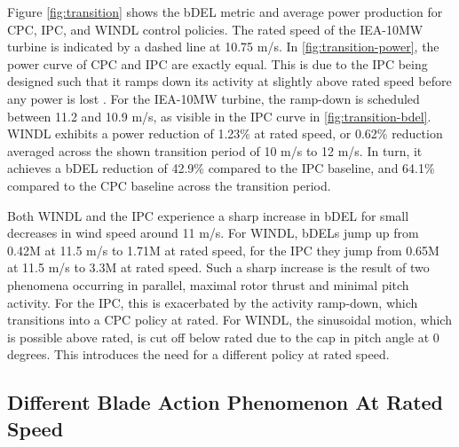 Figure \ref{fig:transition} shows the bDEL metric and average power production for CPC, IPC, and WINDL control policies. The rated speed of the IEA-10MW turbine is indicated by a dashed line at 10.75 m/s. In \ref{fig:transition-power}, the power curve of CPC and IPC are exactly equal. This is due to the IPC being designed such that it ramps down its activity at slightly above rated speed before any power is lost \cite{perez-beckerImplementationValidationAdvanced2021}. For the IEA-10MW turbine, the ramp-down is scheduled between 11.2 and 10.9 m/s, as visible in the IPC curve in \ref{fig:transition-bdel}. WINDL exhibits a power reduction of 1.23\% at rated speed, or 0.62\% reduction averaged across the shown transition period of 10 m/s to 12 m/s. In turn, it achieves a bDEL reduction of 42.9\% compared to the IPC baseline, and 64.1\% compared to the CPC baseline across the transition period. 

Both WINDL and the IPC experience a sharp increase in bDEL for small decreases in wind speed around 11 m/s. For WINDL, bDELs jump up from 0.42M at 11.5 m/s to 1.71M at rated speed, for the IPC they jump from 0.65M at 11.5 m/s to 3.3M at rated speed. Such a sharp increase is the result of two phenomena occurring in parallel, maximal rotor thrust and minimal pitch activity. For the IPC, this is exacerbated by the activity ramp-down, which transitions into a CPC policy at rated. For WINDL, the sinusoidal motion, which is possible above rated, is cut off below rated due to the cap in pitch angle at 0 degrees. This introduces the need for a different policy at rated speed. 

\subsection{Different Blade Action Phenomenon At Rated Speed}

